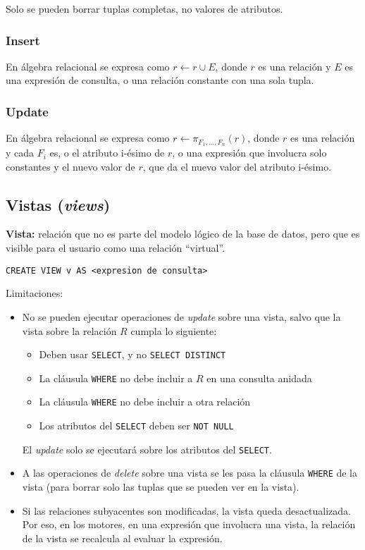 \documentclass[a4paper, twoside]{article}
\begin{document}
Solo se pueden borrar tuplas completas, no valores de atributos.

\subsubsection{Insert}
En álgebra relacional se expresa como $r\leftarrow r\cup E$, donde $r$ es una relación y $E$ es una expresión de consulta, o una relación constante con una sola tupla.

\subsubsection{Update}
En álgebra relacional se expresa como $r\leftarrow\pi_{F_{1},\dots,F_{n}}(r)$, donde $r$ es una relación y cada $F_{i}$ es, o el atributo i-ésimo de $r$, o una expresión que involucra solo constantes y el nuevo valor de $r$, que da el nuevo valor del atributo i-ésimo.

\subsection{Vistas (\emph{views})}
\textbf{Vista:} relación que no es parte del modelo lógico de la base de datos, pero que es visible para el usuario como una relación ``virtual''.

\begin{lstlisting}
CREATE VIEW v AS <expresion de consulta>
\end{lstlisting}

Limitaciones:
\begin{itemize}
	\item No se pueden ejecutar operaciones de \emph{update} sobre una vista, salvo que la vista sobre la relación $R$ cumpla lo siguiente:
	\begin{itemize}
		\item Deben usar \texttt{SELECT}, y no \texttt{SELECT DISTINCT}
		\item La cláusula \texttt{WHERE} no debe incluir a $R$ en una consulta anidada
		\item La cláusula \texttt{WHERE} no debe incluir a otra relación
		\item Los atributos del \texttt{SELECT} deben ser \texttt{NOT NULL}
	\end{itemize}

	El \emph{update} solo se ejecutará sobre los atributos del \texttt{SELECT}.

	\item A las operaciones de \emph{delete} sobre una vista se les pasa la cláusula \texttt{WHERE} de la vista (para borrar solo las tuplas que se pueden ver en la vista).

	\item Si las relaciones subyacentes son modificadas, la vista queda desactualizada. Por eso, en los motores, en una expresión que involucra una vista, la relación de la vista se recalcula al evaluar la expresión.
\end{itemize}
\end{document}
